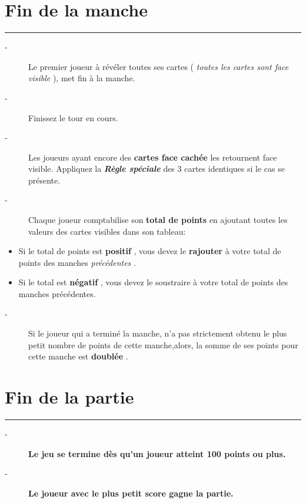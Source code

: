\documentclass{article}%
\begin{document}
%
\section{ Fin de la manche
}%
\label{sec:Findelamanche}%
\rule{18cm}{0.07cm}\break%
\begin{description}%
\item[{-} ]%
%
Le premier joueur à révéler toutes ses cartes (%
\textit{toutes les cartes sont face visible}%
), met fin à la manche.
%
\item[{-} ]%
%
 Finissez le tour en cours.
%
\item[{-} ]%
%
 Les joueurs ayant encore des %
\textbf{cartes face cachée}%
\textit{ }%
 les retournent face visible. Appliquez la %
\textbf{\textit{Règle spéciale}}%
\textit{ }%
 des 3 cartes identiques si le cas se présente.
%
\item[{-} ]%
%
 Chaque joueur comptabilise son %
\textbf{total de points}%
\textit{ }%
 en ajoutant toutes les valeurs des cartes visibles dans son tableau:
%
\end{description}%
\begin{itemize}%
\item%
%
 Si le total de points est %
\textbf{positif}%
, vous devez le %
\textbf{rajouter}%
\textit{ }%
 à votre total de points des manches %
\textit{précédentes}%
.
%
\item%
%
 Si le total est %
\textbf{négatif}%
, vous devez le soustraire à votre total de points des manches précédentes.
%
\end{itemize}%
\begin{description}%
\item[{-} ]%
%
Si le joueur qui a terminé la manche, n’a pas strictement obtenu le plus petit nombre de points de cette manche,alors, la somme de ses points pour cette manche est %
\textbf{doublée}%
.
%
\end{description}

%
\section{ Fin de la partie
}%
\label{sec:Findelapartie}%
\rule{18cm}{0.07cm}\break%
\begin{description}%
\item[{-} ]%
%
\textbf{Le jeu se termine dès qu’un joueur atteint 100 points ou plus.}%

%
\item[{-} ]%
%
\textbf{Le joueur avec le plus petit score gagne la partie.}%
\end{description}

%
\end{document}
